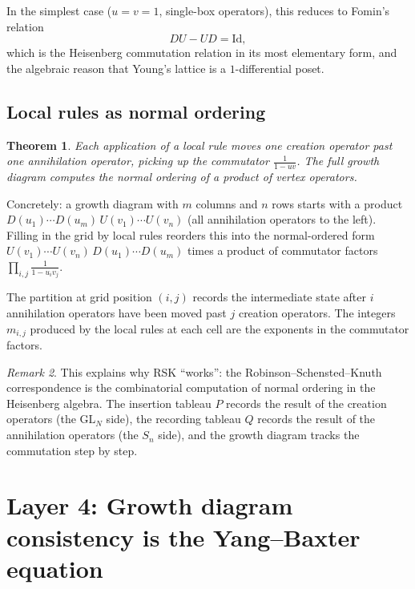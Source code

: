 \documentclass[12pt,a4paper]{article}
\newtheorem{theorem}{Theorem}[section]
\theoremstyle{definition}
\theoremstyle{remark}
\newtheorem{remark}[theorem]{Remark}
\begin{document}
In the simplest case ($u = v = 1$, single-box operators), this reduces
to Fomin's relation
\[
  DU - UD = \mathrm{Id},
\]
which is the Heisenberg commutation relation in its most elementary
form, and the algebraic reason that Young's lattice is a
$1$-differential poset.

\subsection{Local rules as normal ordering}

\begin{theorem}\label{thm:normal-ordering}
Each application of a local rule moves one creation operator past one
annihilation operator, picking up the commutator
$\frac{1}{1-uv}$. The full growth diagram computes the normal ordering
of a product of vertex operators.
\end{theorem}

Concretely: a growth diagram with $m$ columns and $n$ rows starts with
a product $D(u_1) \cdots D(u_m)\, U(v_1) \cdots U(v_n)$ (all
annihilation operators to the left). Filling in the grid by local
rules reorders this into the normal-ordered form
$U(v_1) \cdots U(v_n)\, D(u_1) \cdots D(u_m)$ times a product of
commutator factors $\prod_{i,j} \frac{1}{1-u_i v_j}$.

The partition at grid position $(i,j)$ records the intermediate state
after $i$ annihilation operators have been moved past $j$ creation
operators. The integers $m_{i,j}$ produced by the local rules at
each cell are the exponents in the commutator factors.

\begin{remark}
This explains why RSK ``works'': the Robinson--Schensted--Knuth
correspondence is the combinatorial computation of normal ordering
in the Heisenberg algebra. The insertion tableau $P$ records the result
of the creation operators (the $\mathrm{GL}_N$ side), the recording
tableau $Q$ records the result of the annihilation operators (the
$S_n$ side), and the growth diagram tracks the commutation step by step.
\end{remark}

\section{Layer 4: Growth diagram consistency is the Yang--Baxter equation}
\label{sec:YBE}
\end{document}
